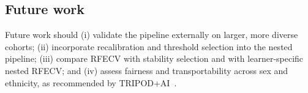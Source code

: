 \subsection{Future work}
Future work should (i) validate the pipeline externally on larger, more diverse cohorts; (ii) incorporate recalibration and threshold selection into the nested pipeline; (iii) compare RFECV with stability selection and with learner-specific nested RFECV; and (iv) assess fairness and transportability across sex and ethnicity, as recommended by TRIPOD+AI~\cite{collins2024tripodai}.
